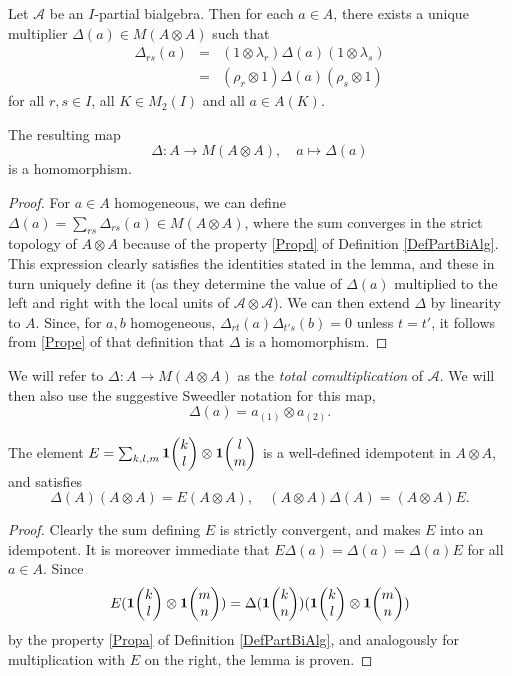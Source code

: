 \begin{Lem} Let $\mathscr{A}$ be an $I$-partial bialgebra. Then for each $a\in A$, there exists a unique multiplier $\Delta(a) \in M(A\otimes A)$ such that \begin{eqnarray}\label{EqDel} \Delta_{rs}(a) &=& (1\otimes \lambda_r)\Delta(a)(1\otimes \lambda_s) \\ &=& (\rho_r\otimes 1)\Delta(a)(\rho_s\otimes 1)\end{eqnarray}  for all $r,s\in I$, all $K\in M_2(I)$ and all $a\in A(K)$. 

The resulting map \[\Delta:A\rightarrow M(A\otimes A),\quad a\mapsto \Delta(a)\] is a homomorphism.
\end{Lem}
\begin{proof} For $a\in A$ homogeneous, we can define $\Delta(a) = \sum_{rs} \Delta_{rs}(a) \in M(A\otimes A)$, where the sum converges in the strict topology of $A\otimes A$ because of the property \ref{Propd} of Definition \ref{DefPartBiAlg}. This expression clearly satisfies the identities stated in the lemma, and these in turn uniquely define it (as they determine the value of $\Delta(a)$ multiplied to the left and right with the local units of $\mathscr{A}\otimes \mathscr{A}$). We can then extend $\Delta$ by linearity to $A$. Since, for $a,b$ homogeneous, $\Delta_{rt}(a)\Delta_{t's}(b)=0$ unless $t=t'$, it follows from \ref{Prope} of that definition that $\Delta$ is a homomorphism. 
\end{proof}

We will refer to $\Delta: A\rightarrow M(A\otimes A)$ as the \emph{total comultiplication} of $\mathscr{A}$. We will then also use the suggestive Sweedler notation for this map, \[\Delta(a) = a_{(1)}\otimes a_{(2)}.\]

\begin{Lem} The element $E = \sum_{k,l,m} \mathbf{1}\!\begin{pmatrix} k \\ l\end{pmatrix}\otimes \mathbf{1}\!\begin{pmatrix} l \\ m\end{pmatrix}$ is a well-defined idempotent in $A\otimes A$, and satisfies \[\Delta(A)(A\otimes A)=E(A\otimes A),\quad (A\otimes A)\Delta(A)= (A\otimes A)E.\]
\end{Lem} 
\begin{proof} Clearly the sum defining $E$ is strictly convergent, and makes $E$ into an idempotent. It is moreover immediate that $E\Delta(a)=\Delta(a) = \Delta(a)E$ for all $a\in A$. Since \[E(\mathbf{1}\!\begin{pmatrix} k \\ l\end{pmatrix}\otimes \mathbf{1}\!\begin{pmatrix} m \\ n\end{pmatrix}) = \Delta(\mathbf{1}\!\begin{pmatrix} k \\ n\end{pmatrix})(\mathbf{1}\!\begin{pmatrix} k \\ l\end{pmatrix}\otimes \mathbf{1}\!\begin{pmatrix} m \\ n\end{pmatrix}) \] by the property \ref{Propa} of Definition \ref{DefPartBiAlg}, and analogously for multiplication with $E$ on the right, the lemma is proven. 
\end{proof} 

